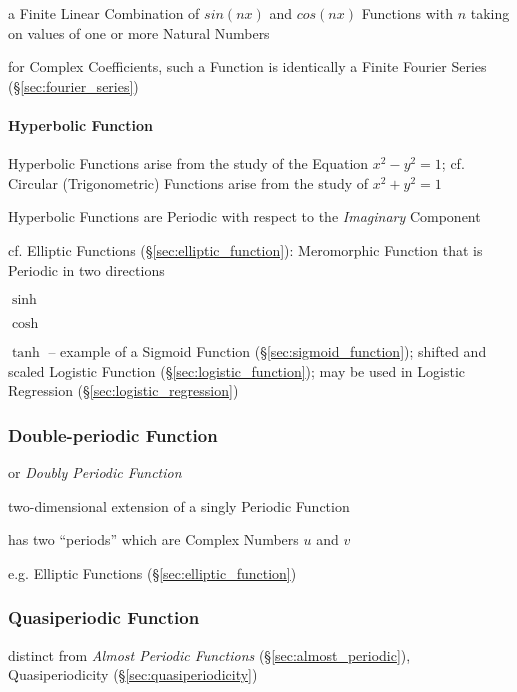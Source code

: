 a Finite Linear Combination of $sin(nx)$ and $cos(nx)$ Functions with $n$ taking
on values of one or more Natural Numbers

for Complex Coefficients, such a Function is identically a Finite Fourier Series
(\S\ref{sec:fourier_series})



\paragraph{Hyperbolic Function}\label{sec:hyperbolic_function}\hfill

Hyperbolic Functions arise from the study of the Equation $x^2 - y^2 = 1$; cf.
Circular (Trigonometric) Functions arise from the study of $x^2 + y^2 = 1$

Hyperbolic Functions are Periodic with respect to the \emph{Imaginary}
Component

cf. Elliptic Functions (\S\ref{sec:elliptic_function}): Meromorphic Function
that is Periodic in two directions

$\sinh$

$\cosh$

$\tanh$ -- example of a Sigmoid Function (\S\ref{sec:sigmoid_function}); shifted
and scaled Logistic Function (\S\ref{sec:logistic_function}); may be used in
Logistic Regression (\S\ref{sec:logistic_regression})



\subsubsection{Double-periodic Function}\label{sec:double_periodic}

or \emph{Doubly Periodic Function}

two-dimensional extension of a singly Periodic Function

has two ``periods'' which are Complex Numbers $u$ and $v$

e.g. Elliptic Functions (\S\ref{sec:elliptic_function})



\subsubsection{Quasiperiodic Function}\label{sec:quasiperiodic_function}

\fist distinct from \emph{Almost Periodic Functions}
(\S\ref{sec:almost_periodic}), Quasiperiodicity (\S\ref{sec:quasiperiodicity})



